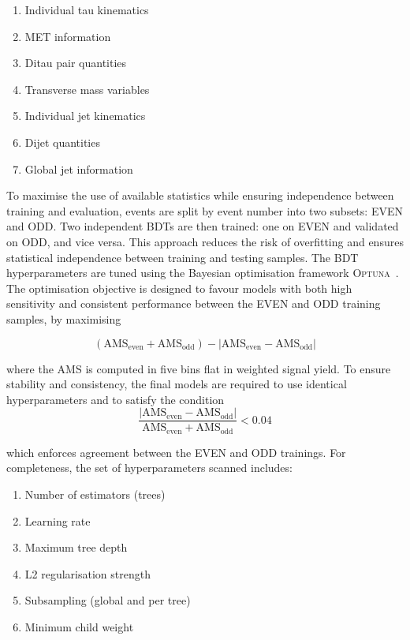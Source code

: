 \begin{enumerate}[label=(\roman*)]
    \item Individual tau kinematics
    \item MET information
    \item Ditau pair quantities
    \item Transverse mass variables
    \item Individual jet kinematics
    \item Dijet quantities
    \item Global jet information
\end{enumerate}

To maximise the use of available statistics while ensuring independence between training and evaluation, events are split by event number into two subsets: EVEN and ODD. 
Two independent \acp{BDT} are then trained: one on EVEN and validated on ODD, and vice versa. 
This approach reduces the risk of overfitting and ensures statistical independence between training and testing samples. The BDT hyperparameters are tuned using the Bayesian optimisation framework \textsc{Optuna}~\cite{akiba2019optunanextgenerationhyperparameteroptimization}. The optimisation objective is designed to favour models with both high sensitivity and consistent performance between the EVEN and ODD training samples, by maximising

\begin{equation}
    (\mathrm{AMS}_{\text{even}} + \mathrm{AMS}_{\text{odd}}) - |\mathrm{AMS}_{\text{even}} - \mathrm{AMS}_{\text{odd}}|
\end{equation}

where the \ac{AMS} is computed in five bins flat in weighted signal yield. To ensure stability and consistency, the final models are required to use identical hyperparameters and to satisfy the condition
\begin{equation}
\frac{|\mathrm{AMS}_{\text{even}} - \mathrm{AMS}_{\text{odd}}|}{\mathrm{AMS}_{\text{even}} + \mathrm{AMS}_{\text{odd}}} < 0.04
\end{equation}

which enforces agreement between the EVEN and ODD trainings. For completeness, the set of hyperparameters scanned includes: 
\begin{enumerate}[label=(\roman*)]
    \item Number of estimators (trees)  
    \item Learning rate  
    \item Maximum tree depth  
    \item L2 regularisation strength  
    \item Subsampling (global and per tree)  
    \item Minimum child weight  
\end{enumerate}

